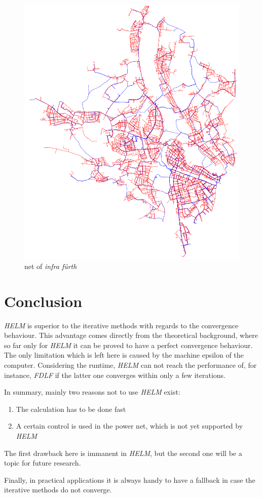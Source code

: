 \begin{figure}
	\centering
	\includegraphics[width=\textwidth]{figures/infra_fuerth_netz}
	\caption[net of \emph{infra fürth}]{net of \emph{infra fürth}}
	\label{fig:infra_fuerth_net}
\end{figure}

\section{Conclusion}
\emph{HELM} is superior to the iterative methods with regards to the convergence behaviour. This advantage comes directly from the theoretical background, where so far only for \emph{HELM} it can be proved to have a perfect convergence behaviour. The only limitation which is left here is caused by the machine epsilon of the computer. Considering the runtime, \emph{HELM} can not reach the performance of, for instance, \emph{FDLF} if the latter one converges within only a few iterations.

In summary, mainly two reasons not to use \emph{HELM} exist:
\begin{enumerate}
	\item The calculation has to be done fast
	\item A certain control is used in the power net, which is not yet supported by \emph{HELM}
\end{enumerate}
The first drawback here is immanent in \emph{HELM}, but the second one will be a topic for future research.

Finally, in practical applications it is always handy to have a fallback in case the iterative methods do not converge.